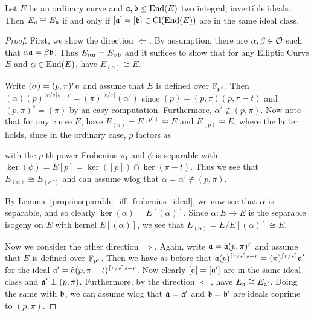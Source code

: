 \begin{lemma}
    Let $E$ be an ordinary curve and $\mathfrak{a}, \mathfrak{b} \leq \mathrm{End}(E)$ two integral, invertible ideals.
    Then $E_{\mathfrak{a}} \cong E_{\mathfrak{b}}$ if and only if $[\mathfrak{a}] = [\mathfrak{b}] \in \mathrm{Cl}(\mathrm{End}(E))$ are in the same ideal class.
\end{lemma}
\begin{proof}
    First, we show the direction $\Leftarrow$.
    By assumption, there are $\alpha, \beta \in \mathcal{O}$ such that $\alpha\mathfrak{a} = \beta\mathfrak{b}$.
    Thus $E_{\alpha\mathfrak{a}} = E_{\beta\mathfrak{b}}$ and it suffices to show that for any Elliptic Curve $E$ and $\alpha \in \mathrm{End}(E)$, have $E_{(\alpha)} \cong E$.

    Write $(\alpha) = (p, \pi)^r \mathfrak{a}$ and assume that $E$ is defined over $\mathbb{F}_{p^s}$.
    Then $(\alpha)(p)^{\lceil r/s \rceil s - r} = (\pi)^{\lceil r/s \rceil}(\alpha')$ since $(p) = (p, \pi)(p, \pi - t)$ and $(p, \pi)^s = (\pi)$ by an easy computation.
    Furthermore, $\alpha' \notin (p, \pi)$.
    Now note that for any curve $E$, have $E_{(\pi)} = E^{(p^s)} \cong E$ and $E_{(p)} \cong E$, where the latter holds, since in the ordinary case, $p$ factors as
    \begin{center}
    \end{center}
    with the $p$-th power Frobenius $\pi_1$ and $\phi$ is separable with $\ker(\phi) = E[p] = \ker([p]) \cap \ker(\pi - t)$.
    Thus we see that $E_{(\alpha)} \cong E_{(\alpha')}$ and can assume wlog that $\alpha = \alpha' \notin (p, \pi)$.

    By Lemma~\ref{prop:inseparable_iff_frobenius_ideal}, we now see that $\alpha$ is separable, and so clearly $\ker(\alpha) = E[(\alpha)]$.
    Since $\alpha: E \to E$ is the separable isogeny on $E$ with kernel $E[(\alpha)]$, we see that $E_{(\alpha)} = E/E[(\alpha)] \cong E$.

    Now we consider the other direction $\Rightarrow$.
    Again, write $\mathfrak{a} = \tilde{\mathfrak{a}}(p, \pi)^r$ and assume that $E$ is defined over $\mathbb{F}_{p^s}$.
    Then we have as before that $\mathfrak{a} (p)^{\lceil r/s \rceil s - r} = (\pi)^{\lceil r/s \rceil} \mathfrak{a}'$ for the ideal $\mathfrak{a}' = \tilde{\mathfrak{a}} (p, \pi - t)^{\lceil r/s \rceil s - r}$.
    Now clearly $[\mathfrak{a}] = [\mathfrak{a}']$ are in the same ideal class and $\mathfrak{a}' \perp (p, \pi)$.
    Furthermore, by the direction $\Leftarrow$, have $E_{\mathfrak{a}} \cong E_{\mathfrak{a}'}$.
    Doing the same with $\mathfrak{b}$, we can assume wlog that $\mathfrak{a} = \mathfrak{a}'$ and $\mathfrak{b} = \mathfrak{b}'$ are ideals coprime to $(p, \pi)$.


\end{proof}
